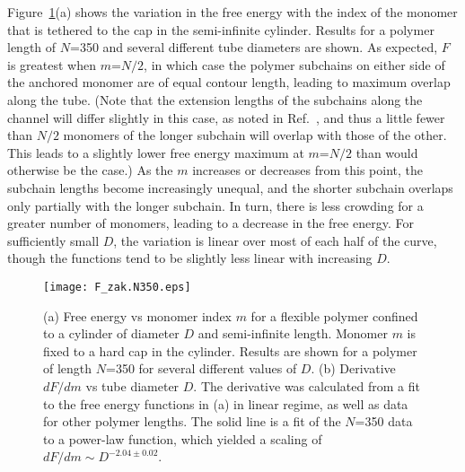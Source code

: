 \documentclass[journal=mamobx,manuscript=article,layout=twocolumn]{achemso}
\begin{document}
Figure~\ref{fig:F_zak.N350}(a) shows the variation in the free energy with the
index of the monomer that is tethered to the cap in the semi-infinite cylinder.
Results for a polymer length of $N$=350 and several different tube diameters
are shown. As expected, $F$ is greatest when $m$=$N/2$, in which case the 
polymer subchains on either side of the anchored monomer are of equal contour length,
leading to maximum overlap along the tube. (Note that the extension lengths of
the subchains along the channel will differ slightly in this case, as noted in 
Ref.~, and thus a little fewer than $N/2$ monomers of the longer
subchain will overlap with those of the other. This leads to a slightly lower
free energy maximum at $m$=$N/2$ than would otherwise be the case.)
As the $m$ increases or decreases
from this point, the subchain lengths become increasingly unequal, and the shorter
subchain overlaps only partially with the longer subchain. In turn, there is less
crowding for a greater number of monomers, leading to a decrease in the
free energy.  For sufficiently small $D$, the variation is linear over most of
each half of the curve, though the functions tend to be slightly less linear with 
increasing $D$.

\begin{figure}[!ht]
\begin{center}
\texttt{[image: F\_zak.N350.eps]}
\end{center}
\caption{
(a) Free energy vs monomer index $m$ for a flexible polymer confined to a cylinder 
of diameter $D$ and semi-infinite length. Monomer $m$ is fixed to a hard cap in the cylinder. 
Results are shown for a polymer of length $N$=350 for several different values of $D$.
(b) Derivative $dF/dm$ vs tube diameter $D$. The derivative was calculated from a fit
to the free energy functions in (a) in linear regime, as well as data for other
polymer lengths. The solid line is a fit of the $N$=350 data to a power-law function, 
which yielded a scaling of $dF/dm \sim D^{-2.04\pm 0.02}$.  }
\label{fig:F_zak.N350}
\end{figure}
\end{document}
